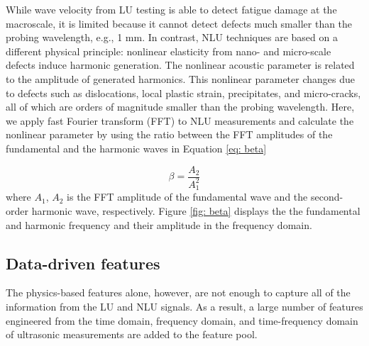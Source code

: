 \begin{itemize}
    While wave velocity from LU testing is able to detect fatigue damage at the macroscale, it is limited because it cannot detect defects much smaller than the probing wavelength, e.g., 1 mm. In contrast, NLU techniques are based on a different physical principle: nonlinear elasticity from nano- and micro-scale defects induce harmonic generation. The nonlinear acoustic parameter is related to the amplitude of generated harmonics. This nonlinear parameter changes due to defects such as dislocations, local plastic strain, precipitates, and micro-cracks, all of which are orders of magnitude smaller than the probing wavelength. Here, we apply fast Fourier transform (FFT) to NLU measurements and calculate the nonlinear parameter by using the ratio between the FFT amplitudes of the fundamental and the harmonic waves in Equation \eqref{eq: beta}

    \begin{equation}
        \beta = \frac{A_2}{A_1^2}
        \label{eq: beta}
    \end{equation}
    where $A_1$, $A_2$ is the FFT amplitude of the fundamental wave and the second-order harmonic wave, respectively. Figure \ref{fig: beta} displays the the fundamental and harmonic frequency and their amplitude in the frequency domain.
\end{itemize}

\subsection{Data-driven features}
The physics-based features alone, however, are not enough to capture all of the information from the LU and NLU signals. As a result, a large number of features engineered from the time domain, frequency domain, and time-frequency domain of ultrasonic measurements are added to the feature pool.

